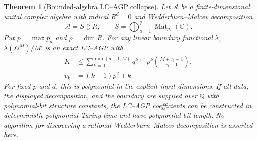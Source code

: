 \documentclass[aps,pra,reprint,superscriptaddress,nofootinbib,longbibliography,showkeys]{revtex4-2}
\newtheorem{theorem}{Theorem}[section]
\theoremstyle{definition}
\newcommand{\Mat}{\operatorname{Mat}}
\begin{document}
\begin{theorem}[Bounded-algebra LC--AGP collapse]
Let $\mathcal A$ be a finite-dimensional unital complex algebra with radical
$R^d=0$ and Wedderburn--Malcev decomposition
\[
 \mathcal A=S\oplus R,\qquad
 S=\bigoplus_{a=1}^q\Mat_{p_a}(\mathbb C).
\]
Put $p=\max p_a$ and $\rho=\dim R$.  For any linear boundary functional
$\lambda$, $\lambda(\Omega^M)/M!$ is an exact LC--AGP with
\begin{align}
 K&\le \sum_{k=0}^{\min(d-1,M)}q^{k+1}\rho^k
 \binom{M+v_k-1}{v_k-1},\nonumber\\
 v_k&=(k+1)p^2+k.
 \label{eq:bounded-collapse}
\end{align}
For fixed $p$ and $d$, this is polynomial in the explicit input dimensions.
If all data, the displayed decomposition, and the boundary are supplied over
$\mathbb Q$ with polynomial-bit structure constants, the LC--AGP coefficients
can be constructed in deterministic polynomial Turing time and have
polynomial bit length.  No algorithm for discovering a rational
Wedderburn--Malcev decomposition is asserted here.
\end{theorem}
\end{document}
